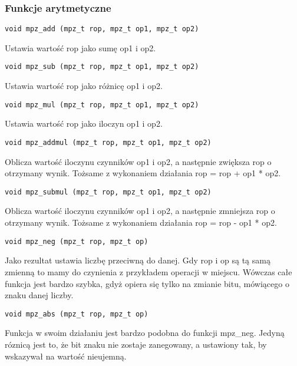\documentclass[twoside,a4paper]{book}
\begin{document}
\subsubsection{Funkcje arytmetyczne}

\begin{lstlisting}
void mpz_add (mpz_t rop, mpz_t op1, mpz_t op2)
\end{lstlisting}

Ustawia wartość rop jako sumę op1 i op2.

\begin{lstlisting}
void mpz_sub (mpz_t rop, mpz_t op1, mpz_t op2)
\end{lstlisting}

Ustawia wartość rop jako różnicę op1 i op2.

\begin{lstlisting}
void mpz_mul (mpz_t rop, mpz_t op1, mpz_t op2)
\end{lstlisting}

Ustawia wartość rop jako iloczyn op1 i op2.

\begin{lstlisting}
void mpz_addmul (mpz_t rop, mpz_t op1, mpz_t op2)
\end{lstlisting}

Oblicza wartość iloczynu czynników op1 i op2, a następnie zwiększa rop o otrzymany wynik. Tożsame z wykonaniem działania rop = rop + op1 * op2.

\begin{lstlisting}
void mpz_submul (mpz_t rop, mpz_t op1, mpz_t op2)
\end{lstlisting}

Oblicza wartość iloczynu czynników op1 i op2, a następnie zmniejsza rop o otrzymany wynik. Tożsame z wykonaniem działania rop = rop - op1 * op2.

\begin{lstlisting}
void mpz_neg (mpz_t rop, mpz_t op)
\end{lstlisting}

Jako rezultat ustawia liczbę przeciwną do danej. Gdy rop i op są tą samą zmienną to mamy do czynienia z przykładem operacji w miejscu. Wówczas całe funkcja jest bardzo szybka, gdyż opiera się tylko na zmianie bitu, mówiącego o znaku danej liczby.

\begin{lstlisting}
void mpz_abs (mpz_t rop, mpz_t op)
\end{lstlisting}

Funkcja w swoim działaniu jest bardzo podobna do funkcji mpz\_neg. Jedyną róznicą jest to, że bit znaku nie zostaje zanegowany, a ustawiony tak, by wskazywał na wartość nieujemną.
\end{document}
